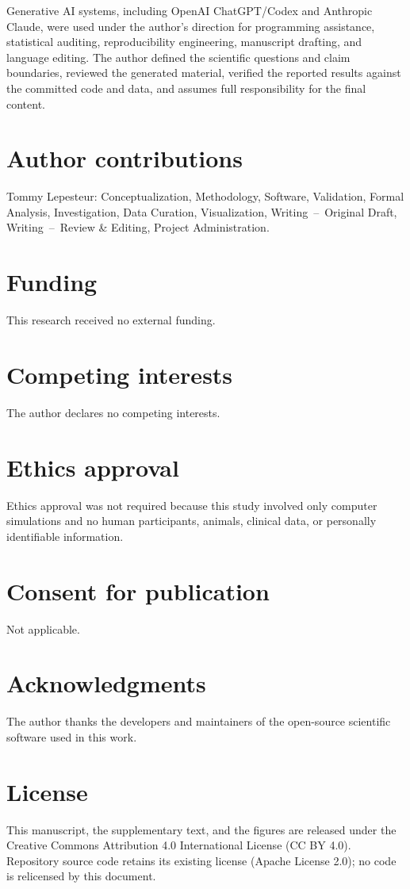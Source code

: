 \documentclass[11pt]{article}
\begin{document}
Generative AI systems, including OpenAI ChatGPT/Codex and Anthropic Claude, were used under the author's direction for programming assistance, statistical auditing, reproducibility engineering, manuscript drafting, and language editing. The author defined the scientific questions and claim boundaries, reviewed the generated material, verified the reported results against the committed code and data, and assumes full responsibility for the final content.

\section*{Author contributions}

Tommy Lepesteur: Conceptualization, Methodology, Software, Validation, Formal Analysis, Investigation, Data Curation, Visualization, Writing~--~Original Draft, Writing~--~Review \& Editing, Project Administration.

\section*{Funding}

This research received no external funding.

\section*{Competing interests}

The author declares no competing interests.

\section*{Ethics approval}

Ethics approval was not required because this study involved only computer simulations and no human participants, animals, clinical data, or personally identifiable information.

\section*{Consent for publication}

Not applicable.

\section*{Acknowledgments}

The author thanks the developers and maintainers of the open-source scientific software used in this work.

\section*{License}

This manuscript, the supplementary text, and the figures are released under the Creative Commons Attribution 4.0 International License (CC BY 4.0). Repository source code retains its existing license (Apache License 2.0); no code is relicensed by this document.



\end{document}
